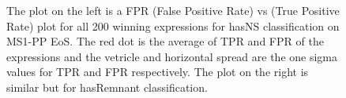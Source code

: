 \begin{figure}[htp]
  \centering
  \quad
  \caption{The plot on the left is a FPR (False Positive Rate) vs (True Positive Rate) plot for all 200 winning expressions for hasNS classification on MS1-PP EoS. The red dot is the average of TPR and FPR of the expressions and the vetricle and horizontal spread are the one sigma values for TPR and FPR respectively. The plot on the right is similar but for hasRemnant classification.  }
  \label{fig:FPR_TPR}
\end{figure}

